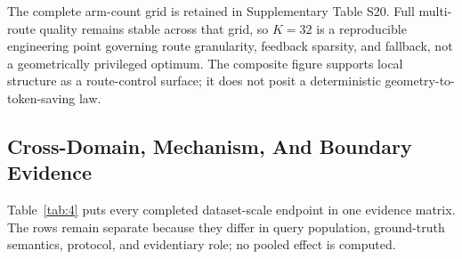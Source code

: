 The complete arm-count grid is retained in Supplementary Table S20. Full multi-route quality remains stable across that grid, so $K=32$ is a reproducible engineering point governing route granularity, feedback sparsity, and fallback, not a geometrically privileged optimum. The composite figure supports local structure as a route-control surface; it does not posit a deterministic geometry-to-token-saving law.

\subsection{Cross-Domain, Mechanism, And Boundary Evidence}
\label{sec:06-results:cross-domain-mechanism-and-boundary-evidence}

Table~\ref{tab:4} puts every completed dataset-scale endpoint in one evidence matrix. The rows remain separate because they differ in query population, ground-truth semantics, protocol, and evidentiary role; no pooled effect is computed.

